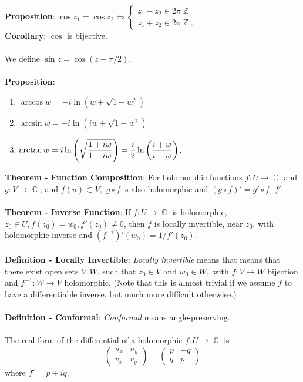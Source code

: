 \documentclass{article}
\DeclareMathOperator{\Z}{\mathbb{Z}}
\DeclareMathOperator{\C}{\mathbb{C}}
\begin{document}
\textbf{Proposition}: $\cos z_1 = \cos z_2 \iff \begin{cases}
    z_1 - z_2 \in 2\pi \Z \\
    z_1 + z_2 \in 2\pi \Z.
\end{cases}$ \\
\textbf{Corollary}: $\cos$ is bijective. \\ \\
We define $\sin{z} = \cos(z - \pi/2)$. \\ \\
\textbf{Proposition}: \begin{enumerate}
    \item $\arccos{w} = -i \ln(w \pm \sqrt{1 - w^2})$
    \item $\arcsin{w} = -i \ln(iw \pm \sqrt{1 - w^2})$
    \item $\mathlarger{\arctan{w} = i \ln \left( \sqrt{\frac{1 + iw}{1 - iw}} \right) = \frac{i}{2} \ln \left( \frac{i + w}{i - w} \right)}$.
\end{enumerate} $ $ \\
\textbf{Theorem - Function Composition}: For holomorphic functions $f: U \rightarrow \C$ and $g: V \rightarrow \C$, and $f(u) \subset V,$ $g \circ f$ is also holomorphic and $(g \circ f)' = g' \circ f \cdot f'.$ \\ \\
\textbf{Theorem - Inverse Function}: If $f: U \rightarrow \C$ is holomorphic, $z_0 \in U, f(z_0) = w_0, f'(z_0) \neq 0$, then $f$ is locally invertible, near $z_0$, with holomorphic inverse and $(f^{-1})'(w_0) = 1/f'(z_0).$ \\ \\
\textbf{Definition - Locally Invertible}: \textit{Locally invertible} means that means that there exist open sets $V, W$, such that $z_0 \in V$ and $w_0 \in W,$ with $f: V \rightarrow W$ bijection and $f^{-1}: W \rightarrow V$ holomorphic. (Note that this is almost trivial if we assume $f$ to have a differentiable inverse, but much more difficult otherwise.)\\ \\
\textbf{Definition - Conformal}: \textit{Conformal} means angle-preserving. \\ \\
The real form of the differential of a holomorphic $f: U \rightarrow \C$ is $$\begin{pmatrix}
    u_x & u_y \\
    v_x & v_y
\end{pmatrix} = \begin{pmatrix}
    p & -q \\
    q & p 
\end{pmatrix}$$ where $f' = p + iq.$ \\ \\
\end{document}
